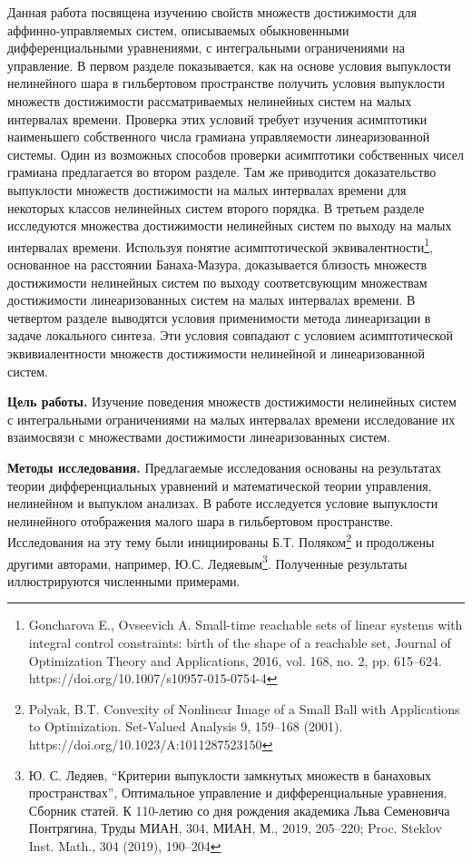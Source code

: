 \documentclass[../main.tex]{subfiles}
\begin{document}
Данная работа посвящена изучению свойств множеств достижимости для аффинно-управляемых систем, описываемых обыкновенными дифференциальными уравнениями, с интегральными ограничениями на управление. В первом разделе показывается, как на основе условия выпуклости нелинейного шара в гильбертовом пространстве получить условия выпуклости множеств достижимости рассматриваемых нелинейных систем на малых интервалах времени. Проверка этих условий требует изучения асимптотики наименьшего собственного числа грамиана управляемости линеаризованной системы. Один из возможных способов проверки асимптотики собственных чисел грамиана предлагается во втором разделе. Там же приводится доказательство выпуклости множеств достижимости на малых интервалах времени для некоторых классов нелинейных систем второго порядка. В третьем разделе исследуются множества достижимости нелинейных систем по выходу на малых интервалах времени. Используя понятие асимптотической эквивалентности\footnote{Goncharova E., Ovseevich A. Small-time reachable sets of linear systems with integral control constraints: birth of the shape of a reachable set, Journal of Optimization Theory and Applications,
2016, vol. 168, no. 2, pp. 615–624. https://doi.org/10.1007/s10957-015-0754-4}, основанное на расстоянии Банаха-Мазура, доказывается близость множеств достижимости нелинейных систем по выходу соответсвующим множествам достижимости линеаризованных систем на малых интервалах времени. В четвертом разделе выводятся условия применимости метода линеаризации в задаче локального синтеза. Эти условия совпадают с условием асимптотической эквивиалентности множеств достижимости нелинейной и линеаризованной систем.

\textbf{Цель работы.} Изучение поведения множеств достижимости нелинейных систем с интегральными ограничениями на малых интервалах времени исследование их взаимосвязи с множествами достижимости линеаризованных систем.
	
\textbf{Методы исследования.} Предлагаемые исследования основаны на результатах теории дифференциальных уравнений и математической теории управления, нелинейном и выпуклом анализах. В работе исследуется условие выпуклости нелинейного отображения малого шара в гильбертовом пространстве. Исследования на эту тему были инициированы Б.Т. Поляком\footnote{Polyak, B.T. Convexity of Nonlinear Image of a Small Ball with Applications to Optimization. Set-Valued Analysis 9, 159–168 (2001). https://doi.org/10.1023/A:1011287523150} и продолжены другими авторами, например, Ю.С. Ледяевым\footnote{Ю. С. Ледяев, “Критерии выпуклости замкнутых множеств в банаховых пространствах”, Оптимальное управление и дифференциальные уравнения, Сборник статей. К 110-летию со дня рождения академика Льва Семеновича Понтрягина, Труды МИАН, 304, МИАН, М., 2019, 205–220; Proc. Steklov Inst. Math., 304 (2019), 190–204}. Полученные результаты иллюстрируются численными примерами.
	
\end{document}
